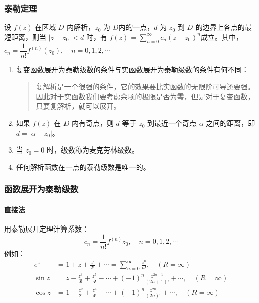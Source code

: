 \subsubsection{泰勒定理}
\label{泰勒定理}
设 \(f(z)\) 在区域 \(D\) 内解析，\(z_0\) 为 \(D\)内的一点，\(d\) 为
\(z_0\) 到 \(D\) 的边界上各点的最短距离，则当 \(|z-z_0| < d\) 时，有
\(f(z)=\sum\limits_{n=0}^{\infty} c_n (z-z_0)^n\)成立。其中，
\(c_n = \dfrac{1}{n!}f^{(n)}(z_0),\quad n = 0,1,2,\cdots\)

\begin{tcolorbox}[title={说明},colback=red!5!white
,colframe=red!75!black
,colbacktitle=yellow!50!red
,coltitle=red!25!black, fonttitle=\bfseries,subtitle style={boxrule=0.4pt, colback=yellow!50!red!25!white}]
\begin{enumerate}
\item 复变函数展开为泰勒级数的条件与实函数展开为泰勒级数的条件有何不同：
\begin{quote}
复解析是一个很强的条件，它的效果要比实函数的无限阶可导还要强。因此对于实函数我们要考虑余项的极限是否为零，但是对于复变函数，只要复解析，就可以展开。
\end{quote}
\item 如果 \(f(z)\) 在 \(D\) 内有奇点，则 \(d\) 等于 \(z_{0}\) 到最近一个奇点 \(\alpha\) 之间的距离，即 \(d = |\alpha - z_0|\)。
\item 当 \(z_0 = 0\) 时，级数称为麦克劳林级数。
\item 任何解析函数在一点的泰勒级数是唯一的。
\end{enumerate}

\end{tcolorbox}
\subsubsection{函数展开为泰勒级数}
\label{函数展开为泰勒级数}
\paragraph{直接法}
\label{直接法}
用泰勒展开定理计算系数：
\[
c_n = \frac{1}{n!} f^{(n)}z_0,\quad n=0,1,2,\cdots
\]
例如：
\begin{align*}
    e^z &= 1 + z + \frac{z^2}{2!} + \cdots = \sum _{n=0}^{\infty} \frac{z^n}{n!}, \quad (R=\infty)
    \\
    \sin z &= z - \frac{z^3}{3!} + \frac{z^5}{5!} - \cdots + (-1)^n\frac{z^{2n+1}}{(2n+1)!} + \cdots,\quad (R=\infty)
    \\
    \cos z &= 1 - \frac{z^2}{2!} + \frac{z^4}{4!} - \cdots + (-1)^n\frac{z^{2n}}{(2n)!} + \cdots, \quad (R=\infty)
\end{align*}
